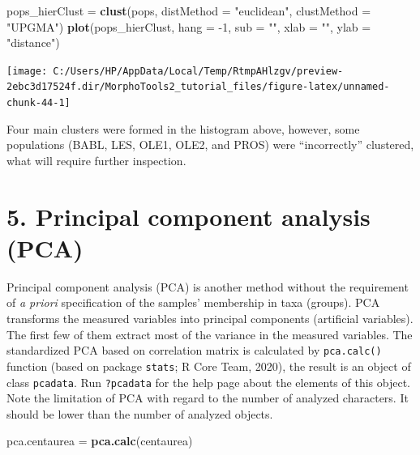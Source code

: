 \documentclass[
]{article}
\newenvironment{Shaded}{\begin{snugshade}}{\end{snugshade}}
\newcommand{\DataTypeTok}[1]{\textcolor[rgb]{0.13,0.29,0.53}{#1}}
\newcommand{\DecValTok}[1]{\textcolor[rgb]{0.00,0.00,0.81}{#1}}
\newcommand{\KeywordTok}[1]{\textcolor[rgb]{0.13,0.29,0.53}{\textbf{#1}}}
\newcommand{\NormalTok}[1]{#1}
\newcommand{\StringTok}[1]{\textcolor[rgb]{0.31,0.60,0.02}{#1}}
\begin{document}
\begin{Shaded}
\begin{Highlighting}[]
\NormalTok{pops_hierClust =}\StringTok{ }\KeywordTok{clust}\NormalTok{(pops, }\DataTypeTok{distMethod =} \StringTok{"euclidean"}\NormalTok{, }\DataTypeTok{clustMethod =} \StringTok{"UPGMA"}\NormalTok{)}
\KeywordTok{plot}\NormalTok{(pops_hierClust, }\DataTypeTok{hang =} \DecValTok{-1}\NormalTok{, }\DataTypeTok{sub =} \StringTok{""}\NormalTok{, }\DataTypeTok{xlab =} \StringTok{""}\NormalTok{, }\DataTypeTok{ylab =} \StringTok{"distance"}\NormalTok{)}
\end{Highlighting}
\end{Shaded}

\begin{center}\texttt{[image: C:/Users/HP/AppData/Local/Temp/RtmpAHlzgv/preview-2ebc3d17524f.dir/MorphoTools2\_tutorial\_files/figure-latex/unnamed-chunk-44-1]} \end{center}

Four main clusters were formed in the histogram above, however, some
populations (BABL, LES, OLE1, OLE2, and PROS) were ``incorrectly''
clustered, what will require further inspection.

\hypertarget{principal-component-analysis-pca}{%
\section{5. Principal component analysis
(PCA)}\label{principal-component-analysis-pca}}

Principal component analysis (PCA) is another method without the
requirement of \emph{a priori} specification of the samples' membership
in taxa (groups). PCA transforms the measured variables into principal
components (artificial variables). The first few of them extract most of
the variance in the measured variables. The standardized PCA based on
correlation matrix is calculated by \texttt{pca.calc()} function (based
on package \texttt{stats}; R Core Team, 2020), the result is an object
of class \texttt{pcadata}. Run \texttt{?pcadata} for the help page about
the elements of this object. Note the limitation of PCA with regard to
the number of analyzed characters. It should be lower than the number of
analyzed objects.

\begin{Shaded}
\begin{Highlighting}[]
\NormalTok{pca.centaurea =}\StringTok{ }\KeywordTok{pca.calc}\NormalTok{(centaurea)}
\end{Highlighting}
\end{Shaded}
\end{document}
